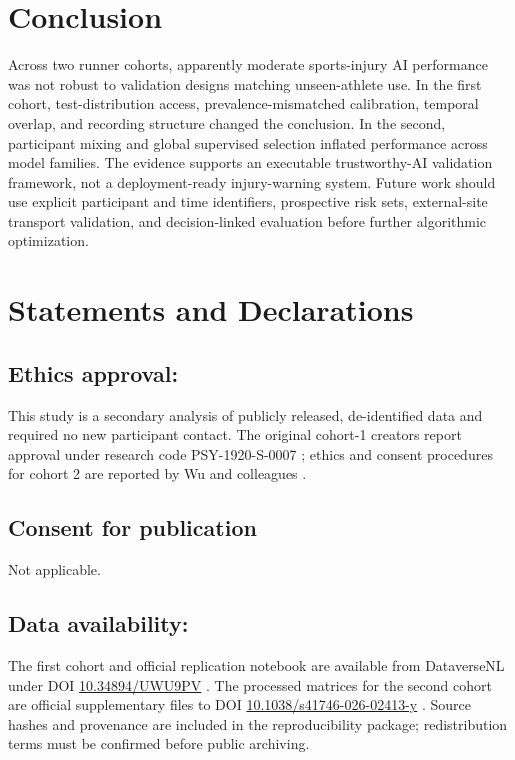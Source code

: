 \documentclass[11pt,a4paper]{article}
\begin{document}
\section{Conclusion}

Across two runner cohorts, apparently moderate sports-injury AI performance was not robust to validation designs matching unseen-athlete use. In the first cohort, test-distribution access, prevalence-mismatched calibration, temporal overlap, and recording structure changed the conclusion. In the second, participant mixing and global supervised selection inflated performance across model families. The evidence supports an executable trustworthy-AI validation framework, not a deployment-ready injury-warning system. Future work should use explicit participant and time identifiers, prospective risk sets, external-site transport validation, and decision-linked evaluation before further algorithmic optimization.



\newpage 
\section*{Statements and Declarations}

\subsection*{Ethics approval:} This study is a secondary analysis of publicly released, de-identified data and required no new participant contact. The original cohort-1 creators report approval under research code PSY-1920-S-0007 \cite{lovdaldataverse2021}; ethics and consent procedures for cohort 2 are reported by Wu and colleagues \cite{wu2026}.

\subsection*{Consent for publication} Not applicable.

\subsection*{Data availability:} The first cohort and official replication notebook are available from DataverseNL under DOI \href{https://doi.org/10.34894/UWU9PV}{10.34894/UWU9PV} \cite{lovdaldataverse2021}. The processed matrices for the second cohort are official supplementary files to DOI \href{https://doi.org/10.1038/s41746-026-02413-y}{10.1038/s41746-026-02413-y} \cite{wu2026}. Source hashes and provenance are included in the reproducibility package; redistribution terms must be confirmed before public archiving.
\end{document}
